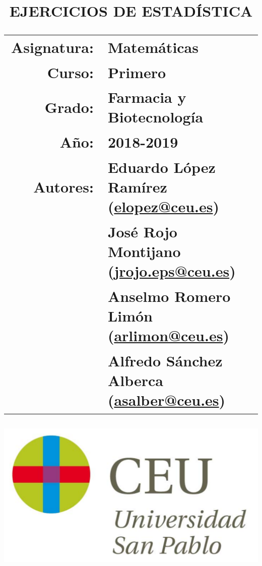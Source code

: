 \documentclass[a4paper,titlepage]{article}
\begin{document}
  \sloppy
  
  \title{\vskip 2cm
  \Huge \textbf{\textsf{\quad \textcolor{blueceu}{EJERCICIOS DE ESTADÍSTICA}\quad}}\\
     \vskip 1cm
  \Large \sffamily
  \begin{tabular}{rl}
  \textcolor{blueceu}{Asignatura:} & Matemáticas\\
  \textcolor{blueceu}{Curso:} & Primero\\
  \textcolor{blueceu}{Grado:} &  Farmacia y Biotecnología\\
  \textcolor{blueceu}{Año:} & 2018-2019\\
  \textcolor{blueceu}{Autores:} & Eduardo L\'opez Ram\'irez (\url{elopez@ceu.es})\\
  & José Rojo Montijano (\url{jrojo.eps@ceu.es})\\
  & Anselmo Romero Lim\'on (\url{arlimon@ceu.es})\\
  & Alfredo S\'anchez Alberca (\url{asalber@ceu.es})
  \end{tabular}
  }
  
  \author{}
  \date{\includegraphics[scale=0.3]{img/logo_uspceu}}
  
  \maketitle
  \newpage
  \tableofcontents
  \newpage
  
  
  
  
  
  
  
  
\end{document}
